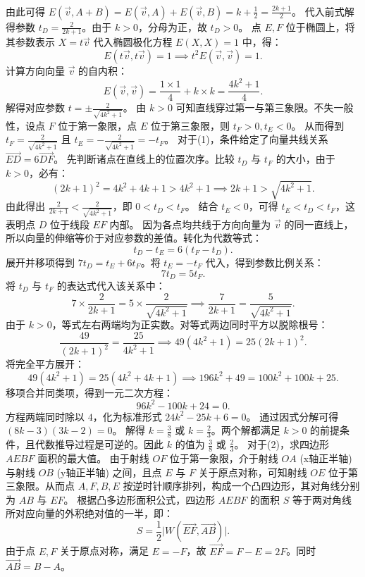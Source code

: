 \begin{solution}
\begin{align*}
\end{align*}
由此可得 $E(\vec{v}, A+B) = E(\vec{v}, A) + E(\vec{v}, B) = k + \frac{1}{2} = \frac{2k+1}{2}$。
代入前式解得参数 $t_D = \frac{2}{2k+1}$。由于 $k>0$，分母为正，故 $t_D > 0$。
点 $E, F$ 位于椭圆上，将其参数表示 $X = t\vec{v}$ 代入椭圆极化方程 $E(X, X) = 1$ 中，得：
\[ E(t\vec{v}, t\vec{v}) = 1 \implies t^2 E(\vec{v}, \vec{v}) = 1. \]
计算方向向量 $\vec{v}$ 的自内积：
\[ E(\vec{v}, \vec{v}) = \frac{1 \times 1}{4} + k \times k = \frac{4k^2+1}{4}. \]
解得对应参数 $t = \pm \frac{2}{\sqrt{4k^2+1}}$。
由 $k>0$ 可知直线穿过第一与第三象限。不失一般性，设点 $F$ 位于第一象限，点 $E$ 位于第三象限，则 $t_F > 0, t_E < 0$。
从而得到 $t_F = \frac{2}{\sqrt{4k^2+1}}$ 且 $t_E = -\frac{2}{\sqrt{4k^2+1}} = -t_F$。
对于(1)，条件给定了向量共线关系 $\overrightarrow{ED} = 6\overrightarrow{DF}$。
先判断诸点在直线上的位置次序。比较 $t_D$ 与 $t_F$ 的大小，由于 $k>0$，必有：
\[ (2k+1)^2 = 4k^2+4k+1 > 4k^2+1 \implies 2k+1 > \sqrt{4k^2+1}. \]
由此得出 $\frac{2}{2k+1} < \frac{2}{\sqrt{4k^2+1}}$，即 $0 < t_D < t_F$。
结合 $t_E < 0$，可得 $t_E < t_D < t_F$，这表明点 $D$ 位于线段 $EF$ 内部。
因为各点均共线于方向向量为 $\vec{v}$ 的同一直线上，所以向量的伸缩等价于对应参数的差值。转化为代数等式：
\[ t_D - t_E = 6(t_F - t_D). \]
展开并移项得到 $7t_D = t_E + 6t_F$。将 $t_E = -t_F$ 代入，得到参数比例关系：
\[ 7t_D = 5t_F. \]
将 $t_D$ 与 $t_F$ 的表达式代入该关系中：
\[ 7 \times \frac{2}{2k+1} = 5 \times \frac{2}{\sqrt{4k^2+1}} \implies \frac{7}{2k+1} = \frac{5}{\sqrt{4k^2+1}}. \]
由于 $k>0$，等式左右两端均为正实数。对等式两边同时平方以脱除根号：
\[ \frac{49}{(2k+1)^2} = \frac{25}{4k^2+1} \implies 49(4k^2+1) = 25(2k+1)^2. \]
将完全平方展开：
\[ 49(4k^2+1) = 25(4k^2+4k+1) \implies 196k^2 + 49 = 100k^2 + 100k + 25. \]
移项合并同类项，得到一元二次方程：
\[ 96k^2 - 100k + 24 = 0. \]
方程两端同时除以 $4$，化为标准形式 $24k^2 - 25k + 6 = 0$。
通过因式分解可得 $(8k - 3)(3k - 2) = 0$。
解得 $k = \frac{3}{8}$ 或 $k = \frac{2}{3}$。两个解都满足 $k>0$ 的前提条件，且代数推导过程是可逆的。因此 $k$ 的值为 $\frac{3}{8}$ 或 $\frac{2}{3}$。
对于(2)，求四边形 $AEBF$ 面积的最大值。
由于射线 $OF$ 位于第一象限，介于射线 $OA$ (x轴正半轴) 与射线 $OB$ (y轴正半轴) 之间，且点 $E$ 与 $F$ 关于原点对称，可知射线 $OE$ 位于第三象限。从而点 $A, F, B, E$ 按逆时针顺序排列，构成一个凸四边形，其对角线分别为 $AB$ 与 $EF$。
根据凸多边形面积公式，四边形 $AEBF$ 的面积 $S$ 等于两对角线所对应向量的外积绝对值的一半，即：
\[ S = \frac{1}{2} \big| W(\overrightarrow{EF}, \overrightarrow{AB}) \big|. \]
由于点 $E, F$ 关于原点对称，满足 $E = -F$，故 $\overrightarrow{EF} = F - E = 2F$。同时 $\overrightarrow{AB} = B - A$。

\end{solution}
